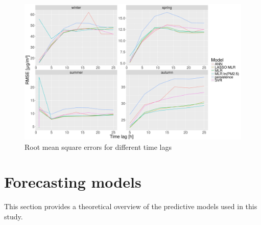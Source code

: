 \begin{figure}[H]
\centering
  \centering
  \includegraphics[width=0.9\linewidth]{figures/methodology/time-lag/rmse_time_lag.png}
  \caption{Root mean square errors for different time lags}
  \label{fig:methodology-time-lag}
\end{figure}

\section{Forecasting models}\label{sec:methodology-predictive-models}
This section provides a theoretical overview of the predictive models used in this study. 

